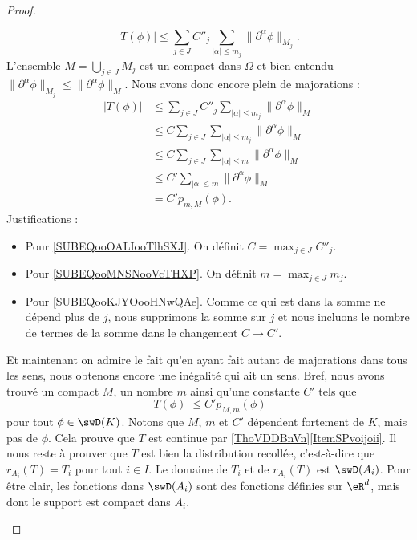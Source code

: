 \begin{proof}
\begin{subproof}
		\begin{equation}
			| T(\phi) |\leq \sum_{j\in J}C''_j\sum_{| \alpha |\leq m_j}\| \partial^{\alpha}\phi \|_{M_j}.
		\end{equation}
		L'ensemble \( M=\bigcup_{j\in J}M_j\) est un compact dans \( \Omega\) et bien entendu \( \| \partial^{\alpha}\phi \|_{M_j}\leq \| \partial^{\alpha}\phi \|_M\). Nous avons donc encore plein de majorations :
		\begin{subequations}
			\begin{align}
				| T(\phi) | & \leq \sum_{j\in J}C''_j\sum_{| \alpha |\leq m_j}\| \partial^{\alpha}\phi \|_M                          \\
				            & \leq C\sum_{j\in J}\sum_{| \alpha |\leq m_j}\| \partial^{\alpha}\phi \|_M  \label{SUBEQooOALIooTlhSXJ} \\
				            & \leq C\sum_{j\in J}\sum_{| \alpha |\leq m}\| \partial^{\alpha}\phi \|_M    \label{SUBEQooMNSNooVcTHXP} \\
				            & \leq C'\sum_{| \alpha |\leq m}\| \partial^{\alpha}\phi \|_M \label{SUBEQooKJYOooHNwQAe}                \\
				            & =C'p_{m,M}(\phi).
			\end{align}
		\end{subequations}
		Justifications :
		\begin{itemize}
			\item Pour \ref{SUBEQooOALIooTlhSXJ}. On définit \( C=\max_{j\in J}C''_j\).
			\item Pour \ref{SUBEQooMNSNooVcTHXP}. On définit \( m=\max_{j\in J}m_j\).
			\item Pour \ref{SUBEQooKJYOooHNwQAe}. Comme ce qui est dans la somme ne dépend plus de \( j\), nous supprimons la somme sur \( j\) et nous incluons le nombre de termes de la somme dans le changement \( C\to C'\).
		\end{itemize}
		Et maintenant on admire le fait qu'en ayant fait autant de majorations dans tous les sens, nous obtenons encore une inégalité qui ait un sens. Bref, nous avons trouvé un compact \( M\), un nombre \( m\) ainsi qu'une constante \( C'\) tels que
		\begin{equation}
			| T(\phi) |\leq C'p_{M,m}(\phi)
		\end{equation}
		pour tout \( \phi\in \swD(K)\). Notons que \( M\), \( m\) et \( C'\) dépendent fortement de \( K\), mais pas de \( \phi\). Cela prouve que \( T\) est continue par \ref{ThoVDDBnVn}\ref{ItemSPvoijoii}.
		Il nous reste à prouver que \( T\) est bien la distribution recollée, c'est-à-dire que \( r_{A_i}(T)=T_i\) pour tout \( i\in I\). Le domaine de \( T_i\) et de \( r_{A_i}(T)\) est \( \swD(A_i)\). Pour être clair, les fonctions dans \( \swD(A_i)\) sont des fonctions définies sur \( \eR^d\), mais dont le support est compact dans \( A_i\).


\end{subproof}
\end{proof}
